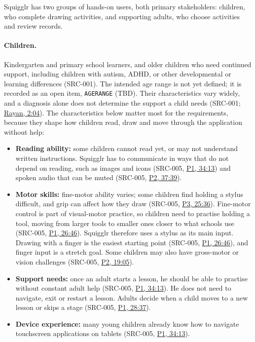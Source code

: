 \documentclass[12pt]{article}
\renewcommand{\_}{\textunderscore\allowbreak}%
\newcommand{\intlink}[3]{\hyperref[int:#1-#2]{#3}}
\newcommand{\intref}[2]{\intlink{#1}{#2}{#1, #2}}
\begin{document}
Squigglr has two groups of hands-on users, both primary stakeholders: children,
who complete drawing activities, and supporting adults, who choose activities
and review records.

\paragraph{Children.} Kindergarten and primary school learners, and older
children who need continued support, including children with autism, ADHD, or
other developmental or learning differences (SRC-001). The intended age range is
not yet defined; it is recorded as an open item, \texttt{AGE\_RANGE} (TBD).
Their characteristics vary widely, and a diagnosis alone does not determine the
support a child needs (SRC-001; \intref{Rayan}{2:04}). The characteristics below
matter most for the requirements, because they shape how children read, draw and
move through the application without help:
\begin{itemize}
  \item \textbf{Reading ability:} some children cannot read yet, or may not
  understand written instructions. Squigglr has to communicate in ways that do
  not depend on reading, such as images and icons (SRC-005, \intref{P1}{34:13})
  and spoken audio that can be muted (SRC-005, \intref{P2}{37:39}).
  \item \textbf{Motor skills:} fine-motor ability varies; some children find
  holding a stylus difficult, and grip can affect how they draw (SRC-005,
  \intref{P3}{25:36}). Fine-motor control is part of visual-motor practice, so
  children need to practise holding a tool, moving from larger tools to smaller
  ones closer to what schools use (SRC-005, \intref{P1}{26:46}). Squigglr
  therefore uses a stylus as its main input. Drawing with a finger is the
  easiest starting point (SRC-005, \intref{P1}{26:46}), and finger input is a
  stretch goal. Some children may also have gross-motor or vision challenges
  (SRC-005, \intref{P2}{19:05}).
  \item \textbf{Support needs:} once an adult starts a lesson, he should be able
  to practise without constant adult help (SRC-005, \intref{P1}{34:13}). He does
  not need to navigate, exit or restart a lesson. Adults decide when a child
  moves to a new lesson or skips a stage (SRC-005, \intref{P1}{28:37}).
  \item \textbf{Device experience:} many young children already know how to
  navigate touchscreen applications on tablets (SRC-005, \intref{P1}{34:13}).
\end{itemize}
\end{document}
